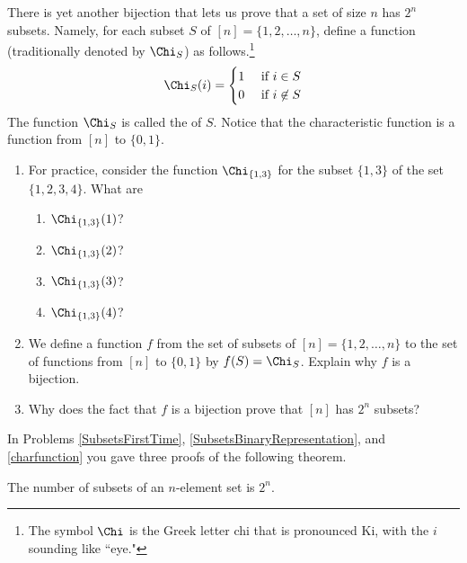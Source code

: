 \itemx  There is yet another bijection that lets us prove  that a set of
size $n$ has $2^n$ subsets.  Namely, for each subset $S$ of
$[n]=\{1,2,\ldots, n\}$, define a function (traditionally
denoted by $\Chi_S$) as follows.\footnote{The symbol
$\Chi$ is the Greek letter chi that is pronounced Ki, with the
$i$ sounding like ``eye."} 
$$\Chi_S(i) = \begin{cases}1 &\mbox{ if } i\in S \\ 0 &\mbox{ if } i\not\in
S\end{cases}$$ The function $\Chi_S$ is called the  of
$S$.  Notice that the characteristic function is a function
from $[n]$ to
$\{0,1\}$.\label{charfunction}
\begin{enumerate}
\item For practice, consider the function $\Chi_{\{1,3\}}$ for
the subset
$\{1,3\}$ of the set $\{1,2,3,4\}$.  What are
\begin{enumerate}
\item $\Chi_{\{1,3\}}(1)$?
\item $\Chi_{\{1,3\}}(2)$?
\item $\Chi_{\{1,3\}}(3)$?
\item $\Chi_{\{1,3\}}(4)$?
\end{enumerate}
\item We define a function $f$ from the set of subsets of
$[n]=\{1,2,\ldots, n\}$ to the set of functions from $[n]$ to
$\{0,1\}$ by $f(S)=\Chi_S$.  Explain why $f$ is a bijection. 
\item Why does the fact that $f$ is a bijection prove that
$[n]$ has $2^n$ subsets?
\end{enumerate}


\ep

In Problems \ref{SubsetsFirstTime}, \ref{SubsetsBinaryRepresentation}, and
\ref{charfunction} you gave three proofs of the following
theorem.

\begin{theorem} The number of subsets of an $n$-element set is
$2^n$.
\end{theorem}



